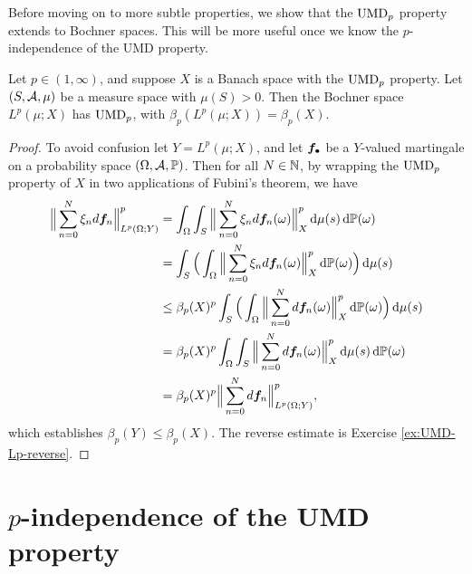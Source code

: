 Before moving on to more subtle properties, we show that the $\mathrm{UMD}_{p}$ property extends to Bochner spaces.
This will be more useful once we know the $p$-independence of the UMD property.

\begin{prop}\label{prop:Bochner-UMDp}
  Let $p \in (1,\infty)$, and suppose $X$ is a Banach space with the $\mathrm{UMD}_{p}$ property.
  Let $(S,\mathcal{A},\mu)$ be a measure space with $\mu(S) > 0$.
  Then the Bochner space $L^p(\mu;X)$ has $\mathrm{UMD}_{p}$, with $\beta_{p}(L^p(\mu;X)) = \beta_{p}(X)$.
\end{prop}

\begin{proof}
  To avoid confusion let $Y = L^p(\mu;X)$, and let $\bm{f}_{\bullet}$ be a $Y$-valued martingale on a probability space $(\Omega,\mathcal{A},\mathbb{P})$.
  Then for all $N \in \mathbb{N}$, by wrapping the $\mathrm{UMD}_{p}$ property of $X$ in two applications of Fubini's theorem, we have
  \begin{equation*}
    \begin{aligned}
      \Big\| \sum_{n=0}^N \xi_{n} d\bm{f}_{n} \Big\|_{L^p(\Omega;Y)}^{p}
      &= \int_{\Omega} \int_{S} \Big\| \sum_{n=0}^N \xi_{n} d\bm{f}_{n}(\omega) \Big\|_{X}^{p} \, \mathrm{d}\mu(s) \, \mathrm{d}\mathbb{P}(\omega) \\
      &=  \int_{S} \Big( \int_{\Omega} \Big\| \sum_{n=0}^N \xi_{n} d\bm{f}_{n}(\omega) \Big\|_{X}^{p}  \, \mathrm{d}\mathbb{P}(\omega) \Big) \, \mathrm{d}\mu(s) \\
      &\leq \beta_{p}(X)^{p} \int_{S} \Big( \int_{\Omega} \Big\| \sum_{n=0}^N d\bm{f}_{n}(\omega) \Big\|_{X}^{p}  \, \mathrm{d}\mathbb{P}(\omega) \Big) \, \mathrm{d}\mu(s) \\
      &= \beta_{p}(X)^{p} \int_{\Omega}  \int_{S} \Big\| \sum_{n=0}^N d\bm{f}_{n}(\omega) \Big\|_{X}^{p}   \, \mathrm{d}\mu(s) \, \mathrm{d}\mathbb{P}(\omega) \\
      &= \beta_{p}(X)^{p} \Big\| \sum_{n=0}^N d\bm{f}_{n} \Big\|_{L^p(\Omega;Y)}^{p},
    \end{aligned}
  \end{equation*}
  which establishes $\beta_{p}(Y) \leq \beta_{p}(X)$.
  The reverse estimate is Exercise \ref{ex:UMD-Lp-reverse}.
\end{proof}

\section{$p$-independence of the UMD property}\label{sec:UMD-p-independence}

